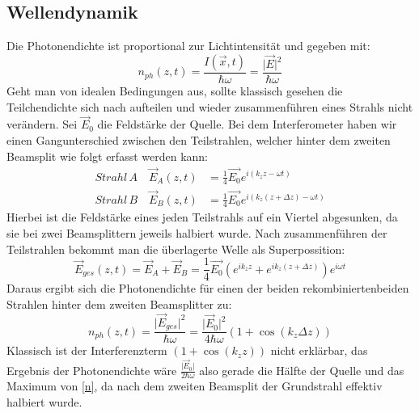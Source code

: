 \documentclass{include/thesisclass3}
\begin{document}
\subsection{Wellendynamik}
Die Photonendichte ist proportional zur Lichtintensität und gegeben mit:
\begin{equation}
n_{ph}(z,t)=\frac{I(\vec{x},t)}{\hbar \omega}=\frac{\vert \vec{E}\vert ^2}{\hbar \omega}
\end{equation}
Geht man von idealen Bedingungen aus, sollte klassisch gesehen die Teilchendichte sich nach aufteilen und wieder zusammenführen eines Strahls nicht verändern. Sei $\vec{E}_0$ die Feldstärke der Quelle. Bei dem Interferometer haben wir einen Gangunterschied zwischen den Teilstrahlen, welcher hinter dem zweiten Beamsplit wie folgt erfasst werden kann:
\begin{align}
\si{Strahl\, A}\quad \vec{E}_A(z,t)&=\frac{1}{4}\vec{E_0}e^{i(k_z z-\omega t)}\\
\si{Strahl\, B}\quad \vec{E}_B(z,t)&=\frac{1}{4}\vec{E_0}e^{i(k_z (z+\Delta z)-\omega t)}
\end{align}
Hierbei ist die Feldstärke eines jeden Teilstrahls auf ein Viertel abgesunken, da sie bei zwei Beamsplittern jeweils halbiert wurde. Nach zusammenführen der Teilstrahlen bekommt man die überlagerte Welle als Superpossition:
\begin{equation}
\vec{E}_{ges}(z,t)= \vec{E}_A+\vec{E}_B=\frac{1}{4}\vec{E_0}(e^{ik_z z}+e^{ik_z (z+\Delta z)})e^{i\omega t}
\end{equation}
Daraus ergibt sich die Photonendichte für einen der beiden rekombiniertenbeiden Strahlen hinter dem zweiten Beamsplitter zu:
\begin{equation}
n_{ph}(z,t)=\frac{\vert \vec{E}_{ges} \vert ^2}{\hbar \omega}=\frac{\vert \vec{E}_0\vert ^2}{4\hbar\omega}(1+\cos(k_z\Delta z))\label{n}
\end{equation}
Klassisch ist der Interferenzterm $(1+\cos(k_z z))$ nicht erklärbar, das Ergebnis der Photonendichte wäre $\frac{\vert \vec{E}_0\vert}{2\hbar \omega}$ also gerade die Hälfte der Quelle und das Maximum von \ref{n}, da nach dem zweiten Beamsplit der Grundstrahl effektiv halbiert wurde. 
\end{document}
